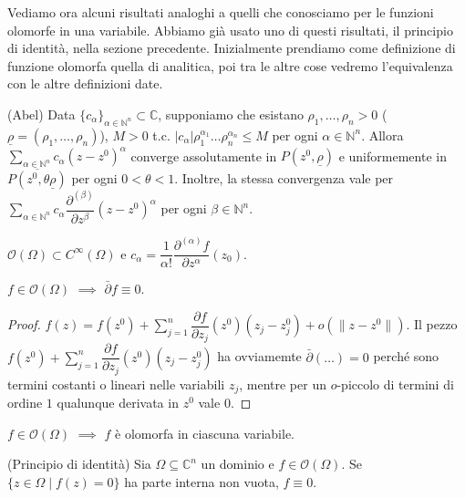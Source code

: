 Vediamo ora alcuni risultati analoghi a quelli che conosciamo per le funzioni olomorfe in una variabile. Abbiamo già usato uno di questi risultati, il principio di identità, nella sezione precedente. Inizialmente prendiamo come definizione di funzione olomorfa quella di analitica, poi tra le altre cose vedremo l'equivalenza con le altre definizioni date.

\begin{lm}
  (Abel) Data $\{c_{\alpha}\}_{\alpha \in \mathbb{N}^n} \subset \mathbb{C}$, supponiamo che esistano $\rho_1, \dots, \rho_n>0$ ($\underline{\rho}=(\rho_1, \dots, \rho_n)$), $M>0$ t.c. $|c_{\alpha}|\rho_1^{\alpha_1}\dots\rho_n^{\alpha_n} \le M$ per ogni $\alpha \in \mathbb{N}^n$.
  Allora $\displaystyle \sum_{\alpha \in \mathbb{N}^n} c_{\alpha}(z-z^0)^{\alpha}$ converge assolutamente in $P(z^0, \underline{\rho})$ e uniformemente in $\overline{P(z^0, \theta\underline{\rho})}$ per ogni $0<\theta<1$.
  Inoltre, la stessa convergenza vale per $\displaystyle \sum_{\alpha \in \mathbb{N}^n} c_{\alpha} \dfrac{\partial^{(\beta)}}{\partial z^\beta}(z-z^0)^\alpha$ per ogni $\beta \in \mathbb{N}^n$.
\end{lm}

\begin{cor} \label{coeff_anal_multi}
  $\mathcal{O}(\Omega) \subset C^\infty(\Omega)$ e $c_\alpha=\dfrac{1}{\alpha!}\dfrac{\partial^{(\alpha)} f}{\partial z^\alpha}(z_0)$.
\end{cor}

\begin{cor}
  $f \in \mathcal{O}(\Omega)$ $\implies$ $\bar{\partial}f \equiv 0$.
\end{cor}

\begin{proof}
  $\displaystyle f(z)=f(z^0)+\sum_{j=1}^n \dfrac{\partial f}{\partial z_j}(z^0)(z_j-z_j^0)+o(\|z-z^0\|)$. Il pezzo $\displaystyle f(z^0)+\sum_{j=1}^n \dfrac{\partial f}{\partial z_j}(z^0)(z_j-z_j^0)$ ha ovviamemte $\bar{\partial}(\dots)=0$ perché sono termini costanti o lineari nelle variabili $z_j$, mentre per un $o$-piccolo di termini di ordine $1$ qualunque derivata in $z^0$ vale $0$.
\end{proof}

\begin{cor} \label{olo_var}
  $f \in \mathcal{O}(\Omega)$ $\implies$ $f$ è olomorfa in ciascuna variabile.
\end{cor}

\begin{prop}
  (Principio di identità) Sia $\Omega \subseteq \mathbb{C}^n$ un dominio e $f \in \mathcal{O}(\Omega)$. Se $\{z \in \Omega \mid f(z)=0\}$ ha parte interna non vuota, $f \equiv 0$.
\end{prop}


